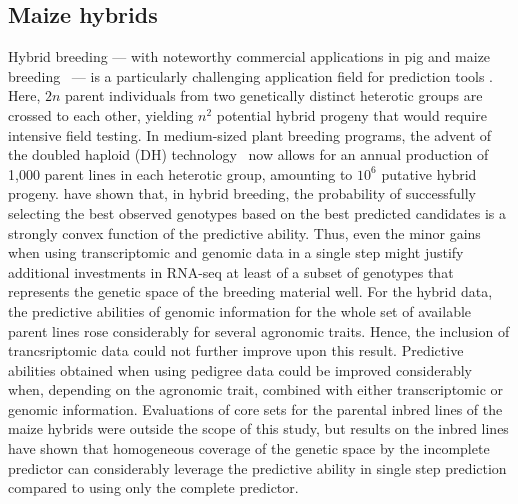 \documentclass[12pt,titlepage]{article}
\begin{document}
\subsection{Maize hybrids}
Hybrid breeding --- with noteworthy commercial applications in pig
\cite{Xiang2016,Tusell2016} and maize breeding~\cite{TheRoyalSociety2009} --- 
is a particularly challenging application field for prediction tools 
\cite{Kadam2016}.
Here, $2n$ parent individuals from two genetically distinct heterotic groups are
crossed to each other, yielding $n^{2}$ potential hybrid progeny that would
require intensive field testing.
In medium-sized plant breeding programs, the advent of the doubled haploid (DH) 
technology~\cite{Wedzony2009} now allows for an annual production of 1,000 
parent lines in each heterotic group, amounting to $10^{6}$ putative hybrid
progeny.
 have shown that, in hybrid breeding, the probability 
of successfully selecting the best observed genotypes based on the best 
predicted candidates is a strongly convex function of the predictive ability.
Thus, even the minor gains when using transcriptomic and genomic data in a
single step might justify additional investments in RNA-seq at least of a
subset of genotypes that represents the genetic space of the breeding 
material well.
For the hybrid data, the predictive abilities of genomic information
for the whole set of available parent lines rose considerably for several
agronomic traits.
Hence, the inclusion of trancsriptomic data could not further improve upon
this result.
Predictive abilities obtained when using pedigree data could be 
improved considerably when, depending on the agronomic trait, combined with 
either transcriptomic or genomic information.
Evaluations of core sets for the parental inbred lines of the maize hybrids were 
outside the scope of this study, but results on the inbred lines have shown that 
homogeneous coverage of the genetic space by the incomplete predictor can 
considerably leverage the predictive ability in single step prediction compared 
to using only the complete predictor.
\end{document}
